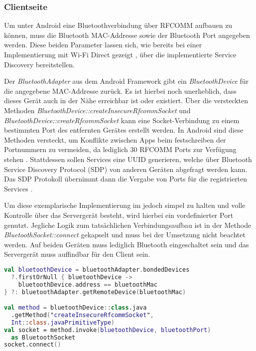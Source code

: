         \subsubsection{Clientseite}
        Um unter Android eine Bluetoothverbindung über RFCOMM aufbauen zu können, muss die Bluetooth MAC-Addresse sowie der Bluetooth Port angegeben werden. Diese beiden Parameter lassen sich, wie bereits bei einer Implementierung mit Wi-Fi Direct gezeigt \cite{aiProject}, über die implementierte Service Discovery bereitstellen.
        
        Der {\it BluetoothAdapter} aus dem Android Framework gibt ein {\it BluetoothDevice} für die angegebene MAC-Addresse zurück. Es ist hierbei noch unerheblich, dass dieses Gerät auch in der Nähe erreichbar ist oder existiert. Über die versteckten Methoden {\it BluetoothDevice::createInsecureRfcommSocket} und {\it BluetoothDevice::createRfcommSocket} kann eine Socket-Verbindung zu einem bestimmten Port des entfernten Gerätes erstellt werden. In Android sind diese Methoden versteckt, um Konflikte zwischen Apps beim festschreiben der Portnummern zu vermeiden, da lediglich 30 RFCOMM Ports zur Verfügung stehen \cite{bluezRfcomm}. Stattdessen sollen Services eine UUID generieren, welche über Bluetooth Service Discovery Protocol (SDP) von anderen Geräten abgefragt werden kann. Das SDP Protokoll übernimmt dann die Vergabe von Ports für die registrierten Services \cite{androidBluetooth}.
        
        Um diese exemplarische Implementierung im  jedoch simpel zu halten und volle Kontrolle über das Servergerät besteht, wird hierbei ein vordefinierter Port genutzt. Jegliche Logik zum tatsächlichen Verbindungsaufbau ist in der Methode {\it BluetoothSocket::connect} gekapselt und muss bei der Umsetzung nicht beachtet werden. Auf beiden Geräten muss lediglich Bluetooth eingeschaltet sein und das Servergerät muss auffindbar für den Client sein.
        
        \begin{lstlisting}[frame=bt, label={lst:android:bluetooth}, language=Kotlin, caption=Verbindungsaufbau mit Bluetooth (Clientcode in Kotlin)]
val bluetoothDevice = bluetoothAdapter.bondedDevices
  ?.firstOrNull { bluetoothDevice ->
    bluetoothDevice.address == bluetoothMac
} ?: bluetoothAdapter.getRemoteDevice(bluetoothMac)

val method = bluetoothDevice::class.java
  .getMethod("createInsecureRfcommSocket",
  Int::class.javaPrimitiveType)
val socket = method.invoke(bluetoothDevice, bluetoothPort)
  as BluetoothSocket
socket.connect()
        \end{lstlisting}
         
